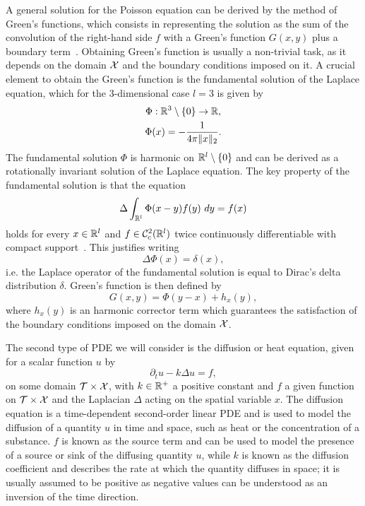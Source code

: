 A general solution for the Poisson equation can be derived by the method of Green's functions, which consists in representing the solution as the sum of the convolution of the right-hand side $f$ with a Green's function $G(x,y)$ plus a boundary term~\cite[Chapter 2.2, Theorem 12]{Evans2010}.
Obtaining Green's function is usually a non-trivial task, as it depends on the domain $\mathcal X$ and the boundary conditions imposed on it.
A crucial element to obtain the Green's function is the fundamental solution of the Laplace equation, which for the 3-dimensional case $l=3$ is given by
\begin{equation}\label{eq:Poisson-fundamental-solution}
    \begin{gathered}
        \Phi : \mathbb{R}^3 \setminus \{0\} \rightarrow \mathbb{R}, \\
        \Phi(x) =  -\frac{1}{4\pi \|x \|_2}.
    \end{gathered}
\end{equation}
The fundamental solution $\Phi$ is harmonic on $\mathbb{R}^l\setminus \{0\}$ and can be derived as a rotationally invariant solution of the Laplace equation.
The key property of the fundamental solution is that the equation 
\[ 
    \Delta \int_{\mathbb{R}^l} \Phi(x-y) f(y) \ dy = f(x) 
\]
holds for every $x \in \mathbb{R}^l$ and $f \in \mathcal C^2_c(\mathbb{R}^l)$ twice continuously differentiable with compact support~\cite[Theorem 1]{Evans2010}.
This justifies writing \[
    \Delta \Phi(x) = \delta(x),
\]
i.e. the Laplace operator of the fundamental solution is equal to Dirac's delta distribution $\delta$.
Green's function is then defined by 
\[
    G(x,y) = \Phi(y-x) + h_x(y),
\]
where $h_x(y)$ is an harmonic corrector term which guarantees the satisfaction of the boundary conditions imposed on the domain $\mathcal X$. \medskip

The second type of PDE we will consider is the diffusion or heat equation, given for a scalar function $u$ by
\begin{equation}\label{eq:diffusion}
    \partial_t u - k \Delta u = f,
\end{equation}
on some domain $\mathcal T \times \mathcal X$, with $k\in \mathbb{R}^+$ a positive constant and $f$ a given function on $\mathcal T \times \mathcal X$ and the Laplacian $\Delta$ acting on the spatial variable $x$.
The diffusion equation is a time-dependent second-order linear PDE and is used to model the diffusion of a quantity $u$ in time and space, such as heat or the concentration of a substance.
$f$ is known as the source term and can be used to model the presence of a source or sink of the diffusing quantity $u$, while $k$ is known as the diffusion coefficient and describes the rate at which the quantity diffuses in space; it is usually assumed to be positive as negative values can be understood as an inversion of the time direction.

